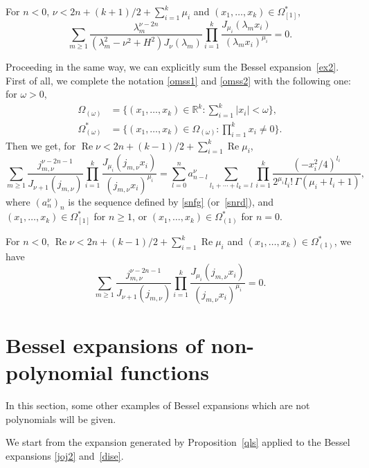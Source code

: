 \documentclass[12pt,leqno]{amsart}
\numberwithin{equation}{section}
\theoremstyle{plain}
\newcommand{\RR}{\mathbb{R}}
\renewcommand{\Re}{\operatorname{Re}}
\begin{document}
For $n<0$, $\nu<2n+(k+1)/2+ \sum_{i=1}^k\mu_i$ and $(x_1,\dots, x_k)\in\Omega^*_{[1]}$,
\begin{equation*}
\sum_{m\ge 1} \frac{\lambda_m^{\nu-2n}}{(\lambda_m^2-\nu^2+H^2)J_\nu(\lambda_m)}
\prod_{i=1}^k \frac{J_{\mu_i}(\lambda_m x_i)}{(\lambda_m x_i)^{\mu_i}} = 0.
\end{equation*}

Proceeding in the same way, we can explicitly sum the Bessel expansion~\eqref{ex2}. First of all, we complete the notation \eqref{omss1} and \eqref{omss2} with the following one: for $\omega>0$,
\begin{align}
\nonumber%
\Omega_{(\omega)} &= \Big\{(x_1,\dots,x_k)\in \RR^k: \sum_{i=1}^k |x_i| < \omega \Big\},\\
\label{omss4}
\Omega^*_{(\omega)} &= \Big\{(x_1,\dots,x_k)\in \Omega_{(\omega)}: \prod_{i=1}^kx_i\not =0 \Big\}.
\end{align}
Then we get, for $\Re \nu<2n+(k-1)/2+ \sum_{i=1}^k\Re\mu_i$,
\begin{equation}
\label{dism2}
\sum_{m\ge 1} \frac{j_{m,\nu}^{\nu-2n-1}}{J_{\nu+1}(j_{m,\nu})}
\prod_{i=1}^k \frac{J_{\mu_i}(j_{m,\nu} x_i)}{(j_{m,\nu} x_i)^{\mu_i}}
= \sum_{l=0}^n a_{n-l}^{\nu} \sum_{l_1+\cdots+l_k=l}
\prod_{i=1}^k\frac{\left(-x_i^2/4\right)^{l_i}}
 {2^{\mu_i}l_i!\, \Gamma(\mu_i + l_i+1)} ,
\end{equation}
where $(a_n^{\nu})_n$ is the sequence defined by \eqref{snfg} (or~\eqref{snrd}), and $(x_1,\dots, x_k)\in\Omega^*_{[1]}$ for $n\ge 1$, or $(x_1,\dots, x_k)\in\Omega^*_{(1)}$ for $n=0$.

For $n<0$, $\Re \nu<2n+(k-1)/2+ \sum_{i=1}^k\Re\mu_i$ and $(x_1,\dots, x_k)\in\Omega^*_{(1)}$, we have
\begin{equation*}
\sum_{m\ge 1} \frac{j_{m,\nu}^{\nu-2n-1}}{J_{\nu+1}(j_{m,\nu})}
\prod_{i=1}^k \frac{J_{\mu_i}(j_{m,\nu} x_i)}{(j_{m,\nu} x_i)^{\mu_i}}
= 0.
\end{equation*}

\section{Bessel expansions of non-polynomial functions}
\label{sec:nopol}

In this section, some other examples of Bessel expansions which are not polynomials will be given.

We start from the expansion generated by Proposition~\ref{qls} applied to the Bessel expansions \eqref{joj2} and~\eqref{dise}.
\end{document}
